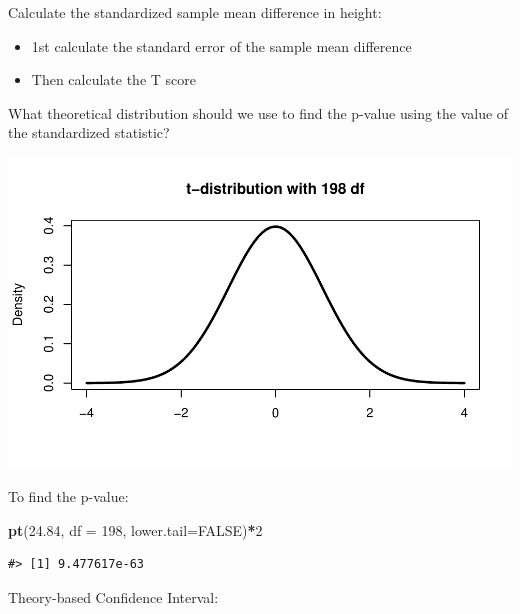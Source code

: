 \documentclass[
]{report}
\newenvironment{Shaded}{\begin{snugshade}}{\end{snugshade}}
\newcommand{\AttributeTok}[1]{\textcolor[rgb]{0.13,0.29,0.53}{#1}}
\newcommand{\ConstantTok}[1]{\textcolor[rgb]{0.56,0.35,0.01}{#1}}
\newcommand{\DecValTok}[1]{\textcolor[rgb]{0.00,0.00,0.81}{#1}}
\newcommand{\FloatTok}[1]{\textcolor[rgb]{0.00,0.00,0.81}{#1}}
\newcommand{\FunctionTok}[1]{\textcolor[rgb]{0.13,0.29,0.53}{\textbf{#1}}}
\newcommand{\NormalTok}[1]{#1}
\newcommand{\SpecialCharTok}[1]{\textcolor[rgb]{0.81,0.36,0.00}{\textbf{#1}}}
\providecommand{\tightlist}{%
  \setlength{\itemsep}{0pt}\setlength{\parskip}{0pt}}
\begin{document}
Calculate the standardized sample mean difference in height:

\begin{itemize}
\tightlist
\item
  1st calculate the standard error of the sample mean difference
\end{itemize}

\vspace{0.5in}

\begin{itemize}
\tightlist
\item
  Then calculate the T score
\end{itemize}

\vspace{0.5in}

What theoretical distribution should we use to find the p-value using the value of the standardized statistic?

\vspace{0.3in}

\begin{center}\includegraphics[width=0.7\linewidth]{11-VN11-paired_files/figure-latex/pvalueheight-1} \end{center}

To find the p-value:

\begin{Shaded}
\begin{Highlighting}[]
\FunctionTok{pt}\NormalTok{(}\FloatTok{24.84}\NormalTok{, }\AttributeTok{df =} \DecValTok{198}\NormalTok{, }\AttributeTok{lower.tail=}\ConstantTok{FALSE}\NormalTok{)}\SpecialCharTok{*}\DecValTok{2}
\end{Highlighting}
\end{Shaded}

\begin{verbatim}
#> [1] 9.477617e-63
\end{verbatim}

Theory-based Confidence Interval:
\end{document}
